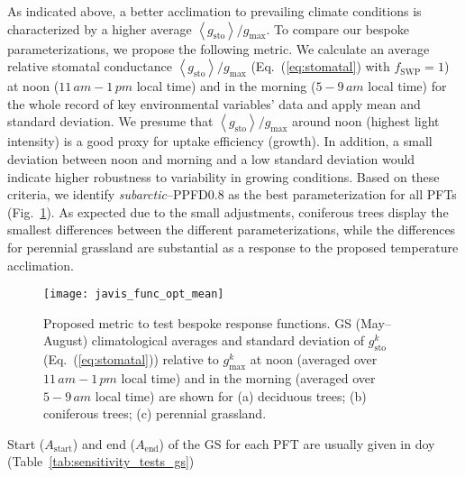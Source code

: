 \documentclass[bg, manuscript]{copernicus}
\begin{document}
As indicated above, a better acclimation to prevailing climate conditions is characterized by a higher average $\left<g_\mathrm{sto}\right>/g_\mathrm{max}$. To compare our bespoke parameterizations, we propose the following metric. We calculate an average relative stomatal conductance $\left<g_\mathrm{sto}\right>/g_\mathrm{max}$ (Eq.~(\ref{eq:stomatal}) with $f_\mathrm{SWP}=1$) at noon ($11\,\unit{am}-1\,\unit{pm}$ local time) and in the morning ($5-9\,\unit{am}$ local time) for the whole record of key environmental variables' data and apply mean and standard deviation. We presume that $\left<g_\mathrm{sto}\right>/g_\mathrm{max}$ around noon (highest light intensity) is a good proxy for  uptake efficiency (growth). In addition, a small deviation between noon and morning and a low standard deviation would indicate higher robustness to variability in growing conditions. Based on these criteria, we identify \emph{subarctic}--PPFD0.8 as the best parameterization for all PFTs (Fig.~\ref{fig:javis_func_opt_mean}). As expected due to the small adjustments, coniferous trees display the smallest differences between the different parameterizations, while the differences for perennial grassland are substantial as a response to the proposed temperature acclimation.

\begin{figure}[t]
  \texttt{[image: javis\_func\_opt\_mean]}
  \caption{Proposed metric to test bespoke response functions. GS (May--August) climatological averages and standard deviation of $g_\mathrm{sto}^k$ (Eq.~(\ref{eq:stomatal})) relative to $g_\mathrm{max}^k$ at noon (averaged over $11\,\unit{am}-1\,\unit{pm}$ local time) and in the morning (averaged over $5-9\,\unit{am}$ local time) are shown for (a) deciduous trees; (b) coniferous trees; (c) perennial grassland.}
  \label{fig:javis_func_opt_mean}
\end{figure}

Start ($A_\text{start}$) and end ($A_\text{end}$) of the GS for each PFT are usually given in \unit{doy} (Table~\ref{tab:sensitivity_tests_gs})
\end{document}
